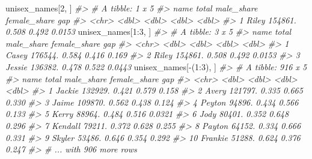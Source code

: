 \documentclass[
]{book}
\newenvironment{Shaded}{\begin{snugshade}}{\end{snugshade}}
\newcommand{\CommentTok}[1]{\textcolor[rgb]{0.56,0.35,0.01}{\textit{#1}}}
\newcommand{\DecValTok}[1]{\textcolor[rgb]{0.00,0.00,0.81}{#1}}
\newcommand{\NormalTok}[1]{#1}
\newcommand{\SpecialCharTok}[1]{\textcolor[rgb]{0.00,0.00,0.00}{#1}}
\begin{document}
\begin{Shaded}
\begin{Highlighting}[]
\NormalTok{unisex\_names[}\DecValTok{2}\NormalTok{, ]}
\CommentTok{\#\textgreater{} \# A tibble: 1 x 5}
\CommentTok{\#\textgreater{}   name    total male\_share female\_share    gap}
\CommentTok{\#\textgreater{}   \textless{}chr\textgreater{}   \textless{}dbl\textgreater{}      \textless{}dbl\textgreater{}        \textless{}dbl\textgreater{}  \textless{}dbl\textgreater{}}
\CommentTok{\#\textgreater{} 1 Riley 154861.      0.508        0.492 0.0153}
\NormalTok{unisex\_names[}\DecValTok{1}\SpecialCharTok{:}\DecValTok{3}\NormalTok{, ]}
\CommentTok{\#\textgreater{} \# A tibble: 3 x 5}
\CommentTok{\#\textgreater{}   name     total male\_share female\_share    gap}
\CommentTok{\#\textgreater{}   \textless{}chr\textgreater{}    \textless{}dbl\textgreater{}      \textless{}dbl\textgreater{}        \textless{}dbl\textgreater{}  \textless{}dbl\textgreater{}}
\CommentTok{\#\textgreater{} 1 Casey  176544.      0.584        0.416 0.169 }
\CommentTok{\#\textgreater{} 2 Riley  154861.      0.508        0.492 0.0153}
\CommentTok{\#\textgreater{} 3 Jessie 136382.      0.478        0.522 0.0443}
\NormalTok{unisex\_names[}\SpecialCharTok{{-}}\NormalTok{(}\DecValTok{1}\SpecialCharTok{:}\DecValTok{3}\NormalTok{), ]}
\CommentTok{\#\textgreater{} \# A tibble: 916 x 5}
\CommentTok{\#\textgreater{}    name      total male\_share female\_share    gap}
\CommentTok{\#\textgreater{}    \textless{}chr\textgreater{}     \textless{}dbl\textgreater{}      \textless{}dbl\textgreater{}        \textless{}dbl\textgreater{}  \textless{}dbl\textgreater{}}
\CommentTok{\#\textgreater{}  1 Jackie  132929.      0.421        0.579 0.158 }
\CommentTok{\#\textgreater{}  2 Avery   121797.      0.335        0.665 0.330 }
\CommentTok{\#\textgreater{}  3 Jaime   109870.      0.562        0.438 0.124 }
\CommentTok{\#\textgreater{}  4 Peyton   94896.      0.434        0.566 0.133 }
\CommentTok{\#\textgreater{}  5 Kerry    88964.      0.484        0.516 0.0321}
\CommentTok{\#\textgreater{}  6 Jody     80401.      0.352        0.648 0.296 }
\CommentTok{\#\textgreater{}  7 Kendall  79211.      0.372        0.628 0.255 }
\CommentTok{\#\textgreater{}  8 Payton   64152.      0.334        0.666 0.331 }
\CommentTok{\#\textgreater{}  9 Skyler   53486.      0.646        0.354 0.292 }
\CommentTok{\#\textgreater{} 10 Frankie  51288.      0.624        0.376 0.247 }
\CommentTok{\#\textgreater{} \# ... with 906 more rows}
\end{Highlighting}
\end{Shaded}
\end{document}
